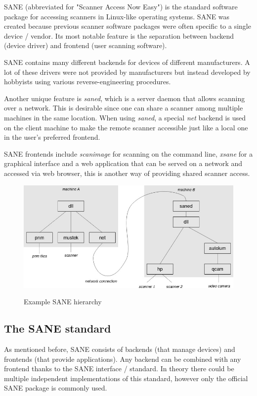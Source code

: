 \documentclass{article}
\begin{document}
SANE (abbreviated for "Scanner Access Now Easy") is the standard software package
for accessing scanners in Linux-like operating systems. SANE was created
because previous scanner software packages were often specific to a single device / vendor.
Its most notable feature is the separation between backend (device driver) 
and frontend (user scanning software).

SANE contains many different backends for devices of different manufacturers.
A lot of these drivers were not provided by manufacturers but instead
developed by hobbyists using various reverse-engineering procedures.

Another unique feature is {\it saned}, which is a server daemon that allows
scanning over a network. This is desirable since one can share a scanner
among multiple machines in the same location. When using {\it saned}, a
special {\it net} backend is used on the client machine to make
the remote scanner accessible just like a local one in the user's preferred frontend.

SANE frontends include {\it scanimage} for scanning on the command line,
{\it xsane} for a graphical interface and a web application that can be served
on a network and accessed via web browser, this is another way of providing shared
scanner access.

\begin{figure}[H]
  \caption{Example SANE hierarchy}
  \centering
  \includegraphics[width=\textwidth]{images/sane_hierarchy.jpg}
  \label{sane_hierarchy}
\end{figure}

\subsection{The SANE standard}
\label{ssec:sanestd}

As mentioned before, SANE consists of backends (that manage devices) and frontends
(that provide applications). Any backend can be combined with any frontend
thanks to the SANE interface / standard. In theory there could be multiple independent
implementations of this standard, however only the official SANE package is
commonly used.
\end{document}

